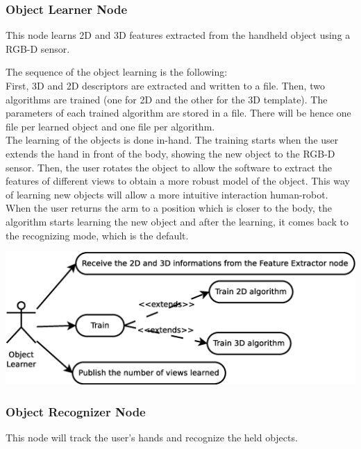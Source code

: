 \documentclass{article}
\begin{document}
\subsubsection{Object Learner Node}

\hspace{0.5cm}This node learns 2D and 3D features extracted from the handheld object using a RGB-D sensor.   

The sequence of the object learning is the following:
\\
First, 3D and 2D descriptors are extracted and written to a file. Then, two algorithms are trained (one for 2D and the other for the 3D template). The parameters of each trained algorithm are stored in a file. There will be hence one file per learned object and one file per algorithm.
\\

The learning of the objects is done in-hand. The training starts when the user extends the hand in front of the body, showing the new object to the RGB-D sensor. Then, the user rotates the object to allow the software to extract the features of different views to obtain a more robust model of the object. This way of learning new objects will allow a more intuitive interaction human-robot. When the user returns the arm to a position which is closer to the body, the algorithm starts learning the new object and after the learning, it comes back to the recognizing mode, which is the default. 

\begin{center}

		\includegraphics[scale=0.4]{../diagrams/images/uc_learner.eps}
	\end{center}

\subsubsection{Object Recognizer Node} 
\hspace{0.5cm}This node will track the user's hands and recognize the held objects. 
\end{document}
